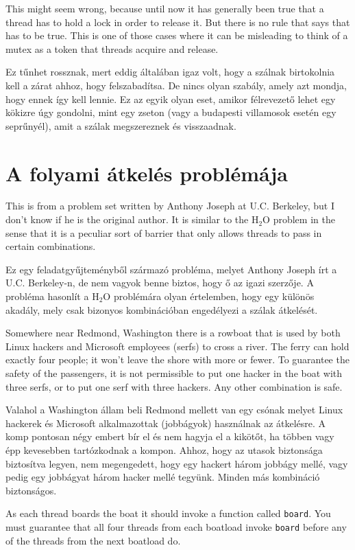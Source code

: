 \documentclass{book}
\begin{document}
This might seem wrong, because until now it
has generally been true that a thread has to hold a lock in
order to release it.  But there is no rule that says that has
to be true.  This is one of those cases where it can be misleading
to think of a mutex as a token that threads acquire and release.

Ez tűnhet rossznak, mert eddig
általában igaz volt, hogy a szálnak birtokolnia kell a zárat ahhoz,
hogy felszabadítsa. De nincs olyan szabály, amely azt mondja, hogy
ennek így kell lennie. Ez az egyik olyan eset, amikor félrevezető lehet
egy kökizre úgy gondolni, mint egy zseton (vagy a budapesti villamosok esetén
egy seprűnyél), amit a szálak megszereznek
és visszaadnak.

\section{A folyami átkelés problémája}

This is from a problem set written by Anthony Joseph
at U.C. Berkeley, but I don't know if he is the original author.
It is similar to the H$_2$O problem in the sense that it is
a peculiar sort of barrier that only allows threads to pass
in certain combinations.

Ez egy feladatgyűjteményből származó probléma, melyet Anthony Joseph írt
a U.C. Berkeley-n, de nem vagyok benne biztos, hogy ő az
igazi szerzője. A probléma hasonlít a H$_2$O problémára
olyan értelemben, hogy egy különös akadály, mely csak bizonyos
kombinációban engedélyezi a szálak átkelését.

Somewhere near Redmond, Washington there is a rowboat that is used by
both Linux hackers and Microsoft employees (serfs) to cross a river.  The
ferry can hold exactly four people; it won't leave the shore with more
or fewer.  To guarantee the safety of the passengers, it is not
permissible to put one hacker in the boat with three serfs, or to
put one serf with three hackers.  Any other combination is safe.

Valahol a Washington állam beli Redmond mellett van egy csónak melyet Linux
hackerek és Microsoft alkalmazottak (jobbágyok) használnak az
átkelésre. A komp pontosan négy embert bír el és nem hagyja el a
kikötőt, ha többen vagy épp kevesebben tartózkodnak a kompon. Ahhoz, hogy
az utasok biztonsága biztosítva legyen, nem megengedett, hogy egy
hackert három jobbágy mellé, vagy pedig egy jobbágyat három hacker mellé
tegyünk. Minden más kombináció biztonságos.

As each thread boards the boat it should invoke a function
called {\tt board}.  You must guarantee that all four threads
from each boatload invoke {\tt board} before any of the threads
from the next boatload do.
\end{document}
